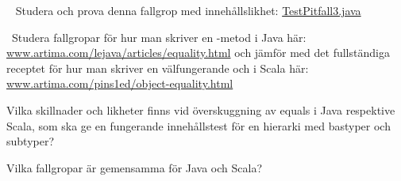 \QUESTEND







\QUESTBEGIN

\Task  \what~ Studera och prova denna fallgrop med innehållslikhet: \href{https://github.com/bjornregnell/lth-eda016-2015/blob/master/lectures/examples/eclipse-ws/lecture-examples/src/week10/generics/TestPitfall3.java}{TestPitfall3.java}







\SOLUTION


\TaskSolved \what



\QUESTEND




\AdvancedTasks %



\QUESTBEGIN

\Task  \what~\Pen Studera fallgropar för hur man skriver en -metod i Java här:
\href{http://www.artima.com/lejava/articles/equality.html}{www.artima.com/lejava/articles/equality.html} och jämför med  det fullständiga receptet för hur man skriver en välfungerande  och  i Scala här: \href{http://www.artima.com/pins1ed/object-equality.html}{www.artima.com/pins1ed/object-equality.html}

\Subtask Vilka skillnader och likheter finns vid överskuggning av equals i Java respektive Scala, som ska ge en fungerande innehållstest för en hierarki med bastyper och subtyper?

\Subtask Vilka fallgropar är gemensamma för Java och Scala?\SOLUTION


\TaskSolved \what



\QUESTEND
